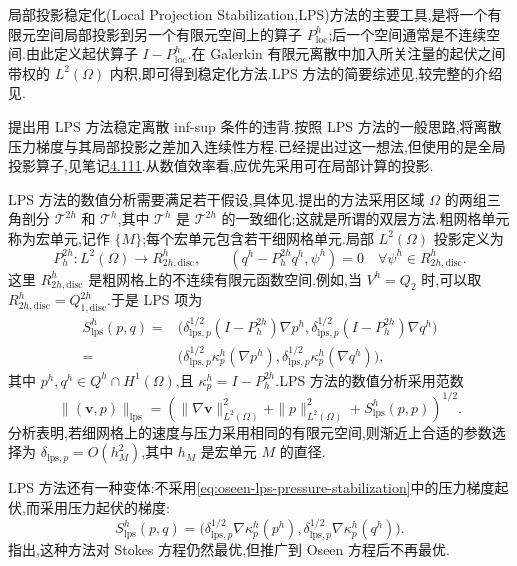 \begin{note}\label{note:oseen-lps-method}
局部投影稳定化(Local Projection Stabilization,LPS)方法的主要工具,是将一个有限元空间局部投影到另一个有限元空间上的算子 $P_{\mathrm{loc}}^h$;后一个空间通常是不连续空间.由此定义起伏算子 $I-P_{\mathrm{loc}}^h$.在 Galerkin 有限元离散中加入所关注量的起伏之间带权的 $L^2(\Omega)$ 内积,即可得到稳定化方法.LPS 方法的简要综述见\textcite{BraackLube2009},较完整的介绍见\textcite[第 IV.4 章]{RoosStynesTobiska2008}.
\end{note}

\begin{note}\label{note:oseen-lps-infsup}
\textcite{BeckerBraack2001}提出用 LPS 方法稳定离散 inf-sup 条件的违背.按照 LPS 方法的一般思路,将离散压力梯度与其局部投影之差加入连续性方程.\textcite{CodinaBlasco1997}已经提出过这一想法,但使用的是全局投影算子,见笔记\hyperref[note:stokes-pressure-gradient-fluctuations]{4.111}.从数值效率看,应优先采用可在局部计算的投影.

LPS 方法的数值分析需要满足若干假设,具体见\textcite{BeckerBraack2001,BraackLube2009}.\textcite{BeckerBraack2001}提出的方法采用区域 $\Omega$ 的两组三角剖分 $\mathcal{T}^{2h}$ 和 $\mathcal{T}^h$,其中 $\mathcal{T}^h$ 是 $\mathcal{T}^{2h}$ 的一致细化;这就是所谓的双层方法.粗网格单元称为宏单元,记作 $\{M\}$;每个宏单元包含若干细网格单元.局部 $L^2(\Omega)$ 投影定义为
\[
 P_h^{2h}:L^2(\Omega)\longrightarrow R_{2h,\mathrm{disc}}^h,
 \qquad
 (q^h-P_h^{2h}q^h,\psi^h)=0
 \quad\forall\psi^h\in R_{2h,\mathrm{disc}}^h.
\]
这里 $R_{2h,\mathrm{disc}}^h$ 是粗网格上的不连续有限元函数空间.例如,当 $V^h=Q_2$ 时,可以取 $R_{2h,\mathrm{disc}}^h=Q_{1,\mathrm{disc}}^{2h}$.于是 LPS 项为
\begin{equation}\label{eq:oseen-lps-pressure-stabilization}
\begin{aligned}
 S_{\mathrm{lps}}^h(p,q)
   ={}&\bigl(\delta_{\mathrm{lps},p}^{1/2}
        (I-P_h^{2h})\nabla p^h,
        \delta_{\mathrm{lps},p}^{1/2}
        (I-P_h^{2h})\nabla q^h\bigr)\\
   ={}&\bigl(\delta_{\mathrm{lps},p}^{1/2}
        \kappa_p^h(\nabla p^h),
        \delta_{\mathrm{lps},p}^{1/2}
        \kappa_p^h(\nabla q^h)\bigr),
\end{aligned}
\end{equation}
其中 $p^h,q^h\in Q^h\cap H^1(\Omega)$,且 $\kappa_p^h=I-P_h^{2h}$.LPS 方法的数值分析采用范数
\[
 \|(\bm{v},p)\|_{\mathrm{lps}}
   =\left(\|\nabla\bm{v}\|_{L^2(\Omega)}^2
      +\|p\|_{L^2(\Omega)}^2
      +S_{\mathrm{lps}}^h(p,p)\right)^{1/2}.
\]
分析表明,若细网格上的速度与压力采用相同的有限元空间,则渐近上合适的参数选择为 $\delta_{\mathrm{lps},p}=O(h_M^2)$,其中 $h_M$ 是宏单元 $M$ 的直径.

LPS 方法还有一种变体:不采用\cref{eq:oseen-lps-pressure-stabilization}中的压力梯度起伏,而采用压力起伏的梯度:
\[
 S_{\mathrm{lps}}^h(p,q)
   =\bigl(\delta_{\mathrm{lps},p}^{1/2}
          \nabla\kappa_p^h(p^h),
          \delta_{\mathrm{lps},p}^{1/2}
          \nabla\kappa_p^h(q^h)\bigr).
\]
\textcite{BraackLube2009}指出,这种方法对 Stokes 方程仍然最优,但推广到 Oseen 方程后不再最优.
\end{note}


